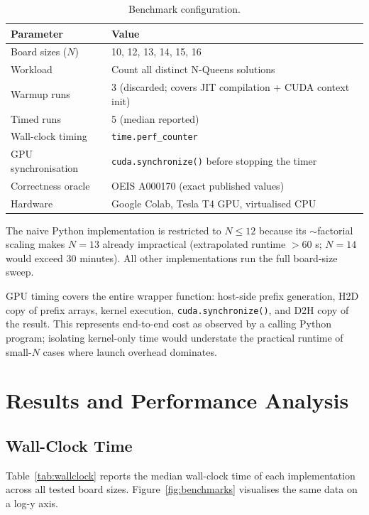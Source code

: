 \documentclass[12pt, letterpaper]{article}
\begin{document}
\begin{table}[H]
\centering
\caption{Benchmark configuration.}
\begin{tabular}{@{}ll@{}}
\toprule
\textbf{Parameter} & \textbf{Value} \\
\midrule
Board sizes ($N$) & 10, 12, 13, 14, 15, 16 \\
Workload & Count all distinct N-Queens solutions \\
Warmup runs & 3 (discarded; covers JIT compilation + CUDA context init) \\
Timed runs & 5 (median reported) \\
Wall-clock timing & \texttt{time.perf\_counter} \\
GPU synchronisation & \texttt{cuda.synchronize()} before stopping the timer \\
Correctness oracle & OEIS A000170 (exact published values) \\
Hardware & Google Colab, Tesla T4 GPU, virtualised CPU \\
\bottomrule
\end{tabular}
\label{tab:method}
\end{table}

The naive Python implementation is restricted to $N \leq 12$ because its $\sim$factorial scaling makes $N = 13$ already impractical (extrapolated runtime $> 60$ s; $N = 14$ would exceed 30 minutes). All other implementations run the full board-size sweep.

GPU timing covers the entire wrapper function: host-side prefix generation, H2D copy of prefix arrays, kernel execution, \texttt{cuda.synchronize()}, and D2H copy of the result. This represents end-to-end cost as observed by a calling Python program; isolating kernel-only time would understate the practical runtime of small-$N$ cases where launch overhead dominates.

\section{Results and Performance Analysis}
\label{sec:results}

\subsection{Wall-Clock Time}

Table~\ref{tab:wallclock} reports the median wall-clock time of each implementation across all tested board sizes. Figure~\ref{fig:benchmarks} visualises the same data on a log-y axis.
\end{document}
